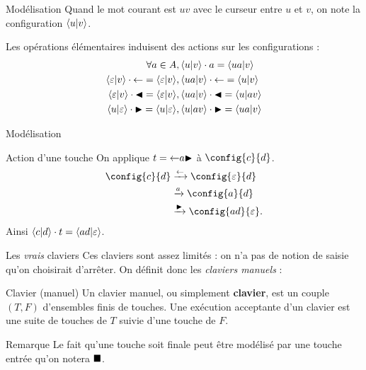 \documentclass[11pt,french]{beamer}
\begin{document}
\begin{frame}{Modélisation}
	Quand le mot courant est $uv$ avec le curseur entre $u$ et $v$, on note la configuration $\left\langle u \middle| v \right\rangle$. \pause

	Les opérations élémentaires induisent des actions sur les configurations :
	\begin{align*}
		\forall a \in A&, \left\langle u \middle| v \right\rangle\cdot a = \left\langle ua \middle| v \right\rangle \\
		\left\langle \varepsilon \middle| v \right\rangle\cdot \mathord{\leftarrow} = \left\langle \varepsilon \middle| v \right\rangle &, \left\langle ua \middle| v \right\rangle\cdot \mathord{\leftarrow} = \left\langle u \middle| v \right\rangle \\
		\left\langle \varepsilon \middle| v \right\rangle\cdot \mathord{\blacktriangleleft} = \left\langle \varepsilon \middle| v \right\rangle &, \left\langle ua \middle| v \right\rangle\cdot \mathord{\blacktriangleleft} = \left\langle u \middle| av \right\rangle \\
		\left\langle u \middle| \varepsilon \right\rangle\cdot \mathord{\blacktriangleright} = \left\langle u \middle| \varepsilon \right\rangle &, \left\langle u \middle| av \right\rangle\cdot \mathord{\blacktriangleright} = \left\langle ua \middle| v \right\rangle \\
	\end{align*}
\end{frame}

\begin{frame}{Modélisation}
	\begin{exampleblock}{Action d'une touche}
		On applique $t = \mathord{\leftarrow} a \mathord{\blacktriangleright}$ à $\config{c}{d}$. \pause
		 \begin{align*}
			\config{c}{d} & \act{\retour} \config{\varepsilon}{d}\\
						  & \act{a}       \config{a}{d}\\
						  & \act{\droite} \config{ad}{\varepsilon}.
		\end{align*}
		Ainsi $\left\langle c \middle| d \right\rangle\cdot t = \left\langle ad \middle| \varepsilon \right\rangle$.
	\end{exampleblock}
	
\end{frame}

\begin{frame}{Les \emph{vrais} claviers} 
	Ces claviers sont assez limités : on n'a pas de notion de saisie qu'on choisirait d'arrêter. \pause On définit donc les \emph{claviers manuels} :
    \begin{block}{Clavier (manuel)}
        Un clavier manuel, ou simplement \textbf{clavier}, est un couple $(T,F)$ d'ensembles finis de touches.
        Une exécution acceptante d'un clavier est une suite de touches de $T$ suivie d'une touche de $F$.
    \end{block} \pause
	\begin{exampleblock}{Remarque}
		Le fait qu'une touche soit finale peut être modélisé par une touche entrée qu'on notera $\mathord{\blacksquare}$.
	\end{exampleblock}
\end{frame}
\end{document}
